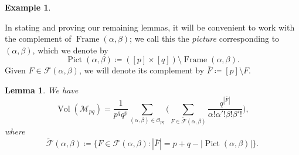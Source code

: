 \documentclass[noamsfonts,10pt]{amsart}
\newcommand{\M}{\mathcal{M}}
\newcommand{\al}{\alpha}
\newcommand{\be}{\beta}
\DeclareMathOperator{\Fr}{Frame}
\DeclareMathOperator{\Pic}{Pict}
\renewcommand{\O}{\mathcal{O}}
\newcommand{\F}{\mathcal{F}}
\DeclareMathOperator{\Vol}{Vol}
\newcommand{\1}{\mathbf{1}}
\theoremstyle{plain}
\newtheorem{lemma}[theorem]{Lemma}
\theoremstyle{definition}
\newtheorem{example}[theorem]{Example}
\numberwithin{equation}{section}
\begin{document}
\begin{example}
\end{example}

In stating and proving our remaining lemmas, it will be convenient to work with the complement of $\Fr(\al,\be)$;
we call this the \emph{picture} corresponding to $(\al,\be)$, which we denote by
\begin{equation}
    \label{Pic definition}
    \Pic(\al,\be) \coloneqq ([p] \times [q]) \setminus \Fr(\al,\be).
\end{equation}
Given $F \in \F(\al,\be)$, we will denote its complement by $\overline{F} \coloneqq [p] \setminus F$.

\begin{lemma}
    \label{lemma:vol as nice sum}
    We have
    \[
        \Vol(\M_{pq}) = \frac{1}{p^q q^p} \sum_{(\al,\be) \in \O_{pq}} \Bigg(
        \sum_{F \in \widetilde{\F}(\al,\be)}
        \frac{q^{|\overline{F}|}}{\al!\al'!\be!\be'!}
        \Bigg),
    \]
    where
    \[
        \widetilde{\F}(\al,\be) \coloneqq \Big\{ F \in \F(\al,\be) : |\overline{F}| = p+q - \left| \Pic(\al,\be) \right| \Big\}.
    \]
\end{lemma}
\end{document}

